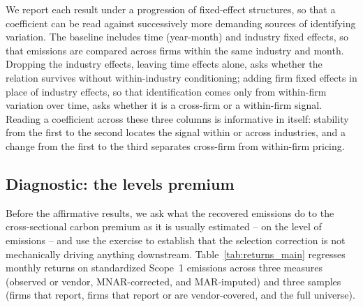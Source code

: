 \documentclass[a4paper,12pt]{article}
\begin{document}
We report each result under a progression of fixed-effect structures, so that a coefficient can be read against successively more demanding sources of identifying variation. The baseline includes time (year-month) and industry fixed effects, so
that emissions are compared across firms within the same industry and month. Dropping the industry effects, leaving time effects alone, asks whether the relation survives without within-industry conditioning; adding firm fixed effects in place of industry effects, so that identification comes only from within-firm variation over time, asks whether it is a cross-firm or a within-firm signal. Reading a coefficient across these three columns is informative in itself: stability from the first to the second locates the signal within or across industries, and a change from the first to the third separates cross-firm from within-firm pricing.
\subsection{Diagnostic: the levels premium}
\label{subsec:bk}

Before the affirmative results, we ask what the recovered emissions do to the cross-sectional carbon premium as it is usually estimated -- on the level of
emissions -- and use the exercise to establish that the selection correction is not mechanically driving anything downstream. Table~\ref{tab:returns_main} regresses monthly returns on standardized Scope~1 emissions across three measures (observed or
vendor, MNAR-corrected, and MAR-imputed) and three samples (firms that report, firms that report or are vendor-covered, and the full universe).
\end{document}
